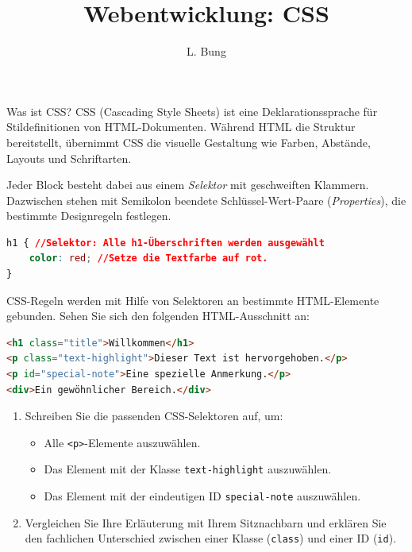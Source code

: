 \documentclass[11pt, a4paper, oneside]{article}
\title{Webentwicklung: CSS}
\author{L. Bung}
\begin{document}
	\maketitle
	
	\begin{hint}{Was ist CSS?}
		CSS (Cascading Style Sheets) ist eine Deklarationssprache für Stildefinitionen von HTML-Dokumenten.
		Während HTML die Struktur bereitstellt, übernimmt CSS die visuelle Gestaltung wie Farben, Abstände, Layouts und Schriftarten.
		
		Jeder Block besteht dabei aus einem \emph{Selektor} mit geschweiften Klammern.
		Dazwischen stehen mit Semikolon beendete Schlüssel-Wert-Paare (\emph{Properties}), die bestimmte Designregeln festlegen.
		
		\begin{lstlisting}[language=CSS, numbers=none]
h1 { //Selektor: Alle h1-Überschriften werden ausgewählt
	color: red; //Setze die Textfarbe auf rot.
}
		\end{lstlisting}
	\end{hint}
	
	
	
	CSS-Regeln werden mit Hilfe von Selektoren an bestimmte HTML-Elemente gebunden.
	Sehen Sie sich den folgenden HTML-Ausschnitt an:
	
	\begin{lstlisting}[language=HTML]
<h1 class="title">Willkommen</h1>
<p class="text-highlight">Dieser Text ist hervorgehoben.</p>
<p id="special-note">Eine spezielle Anmerkung.</p>
<div>Ein gewöhnlicher Bereich.</div>
	\end{lstlisting}
	
	\begin{enumerate}[label=\alph*)]
		\item Schreiben Sie die passenden CSS-Selektoren auf, um:
		\begin{itemize}
			\item Alle \texttt{<p>}-Elemente auszuwählen.
			\item Das Element mit der Klasse \texttt{text-highlight} auszuwählen.
			\item Das Element mit der eindeutigen ID \texttt{special-note} auszuwählen.
		\end{itemize}
		\item Vergleichen Sie Ihre Erläuterung mit Ihrem Sitznachbarn und erklären Sie den fachlichen Unterschied zwischen einer Klasse (\texttt{class}) und einer ID (\texttt{id}).
	\end{enumerate}
	
\end{document}
